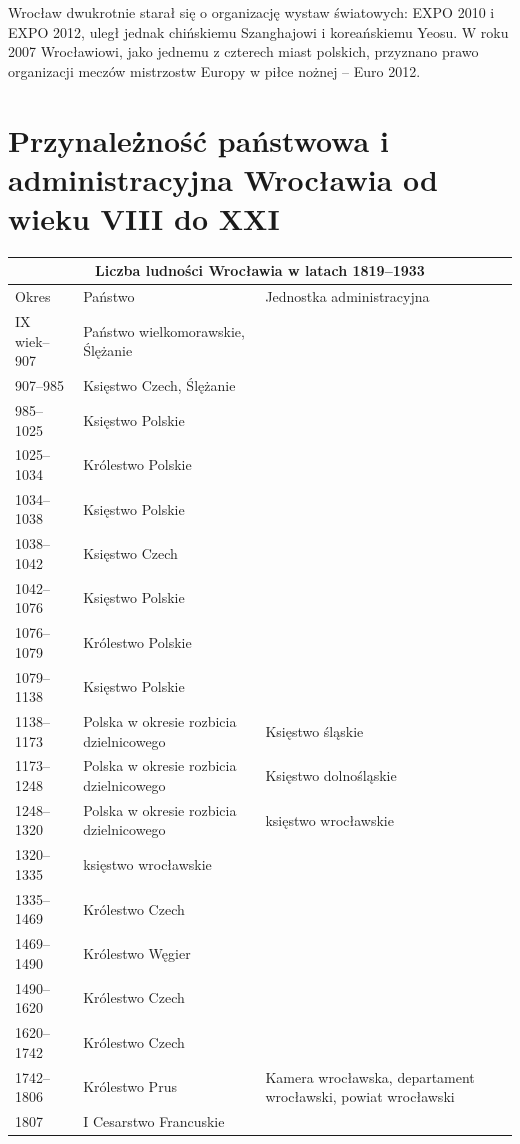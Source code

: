 \documentclass{article}
\begin{document}
Wrocław dwukrotnie starał się o organizację wystaw światowych: EXPO 2010 i EXPO 2012, uległ jednak chińskiemu Szanghajowi i koreańskiemu Yeosu. W roku 2007 Wrocławiowi, jako jednemu z czterech miast polskich, przyznano prawo organizacji meczów mistrzostw Europy w piłce nożnej – Euro 2012.\\
\section{Przynależność państwowa i administracyjna Wrocławia od wieku VIII do XXI}
\begin{tabular}{ |p{2cm}|p{5cm}|p{5cm}| }
 \hline
 \multicolumn{3}{|c|}{Liczba ludności Wrocławia w latach 1819–1933} \\
 \hline
 Okres & Państwo & Jednostka administracyjna\\
 \hline
IX wiek–907 & Państwo wielkomorawskie, Ślężanie & \\
\hline
907–985 & Księstwo Czech, Ślężanie &\\
\hline
985–1025 & Księstwo Polskie &\\
\hline
1025–1034 & Królestwo Polskie &\\
\hline
1034–1038 & Księstwo Polskie &\\
\hline
1038–1042 & Księstwo Czech &\\
\hline
1042–1076 & Księstwo Polskie &\\
\hline
1076–1079 & Królestwo Polskie &\\
\hline
1079–1138 & Księstwo Polskie & \\
\hline
1138–1173 & Polska w okresie rozbicia dzielnicowego & Księstwo śląskie\\
\hline
1173–1248 & Polska w okresie rozbicia dzielnicowego & Księstwo dolnośląskie\\
\hline
1248–1320 & Polska w okresie rozbicia dzielnicowego & księstwo wrocławskie\\
\hline
1320–1335 & księstwo wrocławskie &\\
\hline 
1335–1469 & Królestwo Czech &\\
\hline
1469–1490 & Królestwo Węgier &\\
\hline
1490–1620 & Królestwo Czech &\\
\hline
1620–1742 & Królestwo Czech &\\
\hline
1742–1806 & Królestwo Prus & Kamera wrocławska, departament wrocławski, powiat wrocławski\\
\hline
1807 & I Cesarstwo Francuskie &\\

\end{tabular}
\end{document}
